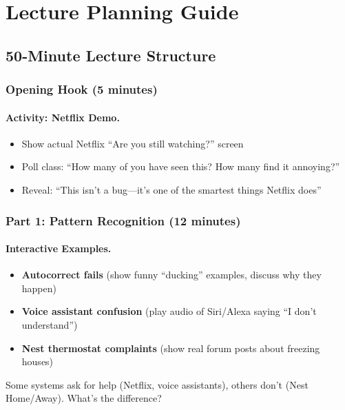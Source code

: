 \section{Lecture Planning Guide}

\subsection{50-Minute Lecture Structure}

\subsubsection{Opening Hook (5 minutes)}

\paragraph{Activity: Netflix Demo.}
\begin{itemize}
    \item Show actual Netflix ``Are you still watching?'' screen
    \item Poll class: ``How many of you have seen this? How many find it annoying?''
    \item Reveal: ``This isn't a bug---it's one of the smartest things Netflix does''
\end{itemize}

\subsubsection{Part 1: Pattern Recognition (12 minutes)}

\paragraph{Interactive Examples.}
\begin{itemize}
    \item \textbf{Autocorrect fails} (show funny ``ducking'' examples, discuss why they happen)
    \item \textbf{Voice assistant confusion} (play audio of Siri/Alexa saying ``I don't understand'')
    \item \textbf{Nest thermostat complaints} (show real forum posts about freezing houses)
\end{itemize}

\begin{keyconcept}
Some systems ask for help (Netflix, voice assistants), others don't (Nest Home/Away). What's the difference?
\end{keyconcept}

